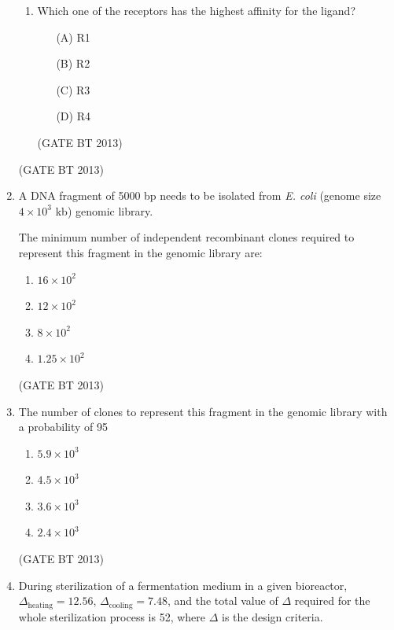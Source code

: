 \documentclass[journal,12pt,onecolumn]{IEEEtran}
\theoremstyle{remark}
\begin{document}
\begin{enumerate}
\begin{enumerate}
    \item Which one of the receptors has the highest affinity for the ligand?
    \begin{enumerate}
        \item[(A)] R1
        \item[(B)] R2
        \item[(C)] R3
        \item[(D)] R4
    \end{enumerate} \hfill(GATE BT 2013)
\end{enumerate} \hfill(GATE BT 2013)

\item 

A DNA fragment of 5000 bp needs to be isolated from \textit{E. coli} (genome size \(4 \times 10^{3}\) kb) genomic library.

The minimum number of independent recombinant clones required to represent this fragment in the genomic library are:

\begin{enumerate}[label=(\Alph*)]
    \item \(16 \times 10^{2}\)
    \item \(12 \times 10^{2}\)
    \item \(8 \times 10^{2}\)
    \item \(1.25 \times 10^{2}\)
\end{enumerate} \hfill(GATE BT 2013)

\item 

The number of clones to represent this fragment in the genomic library with a probability of 95%

\begin{enumerate}[label=(\Alph*)]
    \item \(5.9 \times 10^{3}\)
    \item \(4.5 \times 10^{3}\)
    \item \(3.6 \times 10^{3}\)
    \item \(2.4 \times 10^{3}\)
\end{enumerate} \hfill(GATE BT 2013)

\item 

During sterilization of a fermentation medium in a given bioreactor, \(\Delta_{\text{heating}} = 12.56\), \(\Delta_{\text{cooling}} = 7.48\), and the total value of \(\Delta\) required for the whole sterilization process is 52, where \(\Delta\) is the design criteria.


\end{enumerate}
\end{document}
